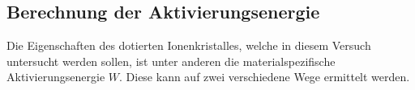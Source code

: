 

    \subsection{Berechnung der Aktivierungsenergie}

        \noindent Die Eigenschaften des dotierten Ionenkristalles, welche in diesem Versuch untersucht werden sollen, ist unter anderen die materialspezifische Aktivierungsenergie $W$.
        Diese kann auf zwei verschiedene Wege ermittelt werden.\\
        
